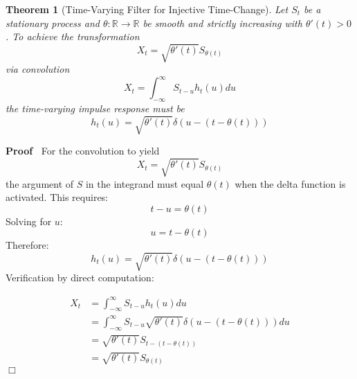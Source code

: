 \documentclass{article}
\newenvironment{proof}{\noindent\textbf{Proof\ }}{\hspace*{\fill}$\Box$\medskip}
\newtheorem{theorem}{Theorem}
\begin{document}
\begin{theorem}
  [Time-Varying Filter for Injective Time-Change] Let $S_t$ be a stationary
  process and $\theta : \mathbb{R} \to \mathbb{R}$ be smooth and strictly
  increasing with $\theta' (t) > 0$. To achieve the transformation
  \begin{equation}
    X_t = \sqrt{\theta' (t)} S_{\theta (t)}
  \end{equation}
  via convolution
  \begin{equation}
    X_t = \int_{- \infty}^{\infty} S_{t - u} h_t (u) du
  \end{equation}
  the time-varying impulse response must be
  \begin{equation}
    h_t (u) = \sqrt{\theta' (t)} \delta (u - (t - \theta (t)))
  \end{equation}
\end{theorem}

\begin{proof}
  For the convolution to yield
  \begin{equation}
    X_t = \sqrt{\theta' (t)} S_{\theta (t)}
  \end{equation}
  the argument of $S$ in the integrand must equal $\theta (t)$ when the delta
  function is activated. This requires:
  \begin{equation}
    t - u = \theta (t)
  \end{equation}
  Solving for $u$:
  \begin{equation}
    u = t - \theta (t)
  \end{equation}
  Therefore:
  \begin{equation}
    h_t (u) = \sqrt{\theta' (t)} \delta (u - (t - \theta (t)))
  \end{equation}
  Verification by direct computation:
  
  \begin{align}
    X_t & = \int_{- \infty}^{\infty} S_{t - u} h_t (u) du \\
    & = \int_{- \infty}^{\infty} S_{t - u}  \sqrt{\theta' (t)} \delta (u - (t
    - \theta (t))) du \\
    & = \sqrt{\theta' (t)} S_{t - (t - \theta (t))} \\
    & = \sqrt{\theta' (t)} S_{\theta (t)} 
  \end{align}
\end{proof}
\end{document}
